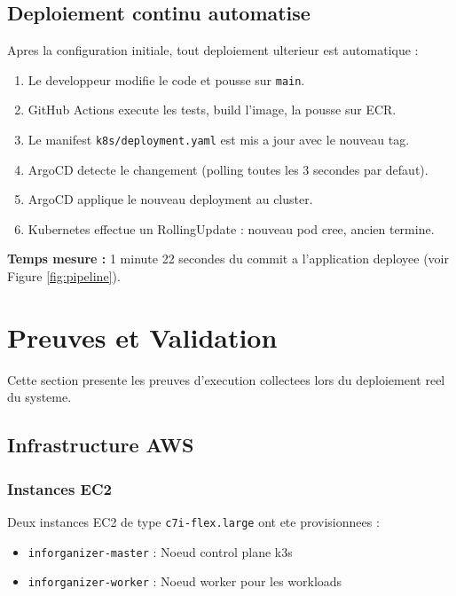 \documentclass[12pt,a4paper,french]{report}
\begin{document}
\section{Deploiement continu automatise}

Apres la configuration initiale, tout deploiement ulterieur est automatique :

\begin{enumerate}
    \item Le developpeur modifie le code et pousse sur \texttt{main}.
    \item GitHub Actions execute les tests, build l'image, la pousse sur ECR.
    \item Le manifest \texttt{k8s/deployment.yaml} est mis a jour avec le nouveau tag.
    \item ArgoCD detecte le changement (polling toutes les 3 secondes par defaut).
    \item ArgoCD applique le nouveau deployment au cluster.
    \item Kubernetes effectue un RollingUpdate : nouveau pod cree, ancien termine.
\end{enumerate}

\textbf{Temps mesure :} 1 minute 22 secondes du commit a l'application deployee (voir Figure \ref{fig:pipeline}).

\chapter{Preuves et Validation}

Cette section presente les preuves d'execution collectees lors du deploiement reel du systeme.

\section{Infrastructure AWS}

\subsection{Instances EC2}

Deux instances EC2 de type \texttt{c7i-flex.large} ont ete provisionnees :
\begin{itemize}
    \item \texttt{inforganizer-master} : Noeud control plane k3s
    \item \texttt{inforganizer-worker} : Noeud worker pour les workloads
\end{itemize}
\end{document}
